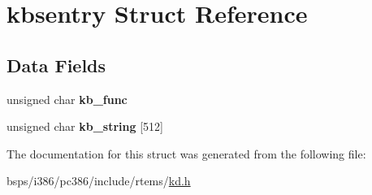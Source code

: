 \hypertarget{structkbsentry}{}\section{kbsentry Struct Reference}
\label{structkbsentry}
\subsection*{Data Fields}
\begin{DoxyCompactItemize}
\item 
\mbox{\label{structkbsentry_a25c4fccd5b1aae9461eaac22a3c12f41}} 
unsigned char {\bfseries kb\+\_\+func}
\item 
\mbox{\label{structkbsentry_a69d0896a8393c8b723c3615625c52ba8}} 
unsigned char {\bfseries kb\+\_\+string} \mbox{[}512\mbox{]}
\end{DoxyCompactItemize}


The documentation for this struct was generated from the following file\+:\begin{DoxyCompactItemize}
\item 
bsps/i386/pc386/include/rtems/\mbox{\hyperlink{kd_8h}{kd.\+h}}\end{DoxyCompactItemize}

